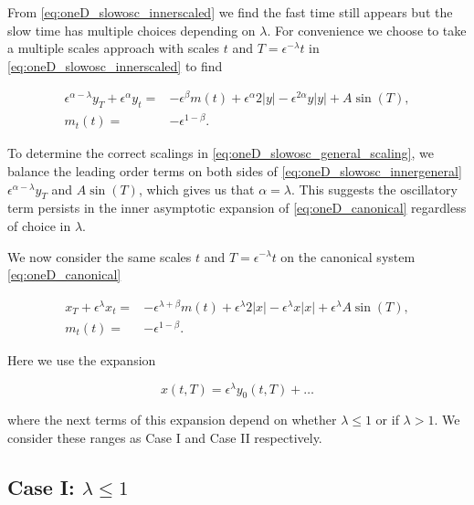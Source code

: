From \eqref{eq:oneD_slowosc_innerscaled} we find the fast time still appears but the slow time has multiple choices depending on $\lambda$. For convenience we choose to take a multiple scales approach with scales $t$ and $T=\epsilon^{-\lambda}t$ in \eqref{eq:oneD_slowosc_innerscaled} to find

\begin{equation}\label{eq:oneD_slowosc_innergeneral}
\begin{aligned}
\epsilon^{\alpha-\lambda} y_T+\epsilon^{\alpha}y_t=& -\epsilon^{\beta}m(t)+\epsilon^{\alpha}2|y|-\epsilon^{2\alpha}y|y|+A\sin(T),\\
m_t(t)=&-\epsilon^{1-\beta}.
\end{aligned}
\end{equation}

To determine the correct scalings in \eqref{eq:oneD_slowosc_general_scaling}, we balance the leading order terms on both sides of \eqref{eq:oneD_slowosc_innergeneral} $\epsilon^{\alpha-\lambda}y_T$ and $A\sin(T)$, which gives us that $\alpha=\lambda$. This suggests the oscillatory term persists in the inner asymptotic expansion of \eqref{eq:oneD_canonical} regardless of choice in $\lambda$.

We now consider the same scales $t$ and $T=\epsilon^{-\lambda}t$ on the canonical system \eqref{eq:oneD_canonical} 

\begin{equation}\label{eq:oneD_slowosc_general_outermulti}
\begin{aligned}
x_T+\epsilon^{\lambda}x_t =& -\epsilon^{\lambda+\beta}m(t)+\epsilon^{\lambda}2|x|-\epsilon^{\lambda}x|x|+\epsilon^{\lambda}A\sin(T),\\
m_t(t) =&-\epsilon^{1-\beta}.
\end{aligned}
\end{equation}

Here we use the expansion 

\begin{equation*}
x(t,T) = \epsilon^{\lambda}y_0(t,T) +\ldots 
\end{equation*}

where the next terms of this expansion depend on whether $\lambda\le1$ or if $\lambda> 1$. We consider these ranges as Case I and Case II respectively.

\subsection{Case I: $\lambda \le 1$}
\label{subsec:oneD_slowosc_caseI}

